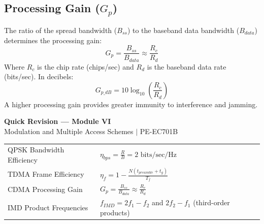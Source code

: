 \documentclass[12pt,a4paper]{article}
\renewcommand{\arraystretch}{1.45}
\begin{document}
\subsection{Processing Gain ($G_p$)}
The ratio of the spread bandwidth ($B_{ss}$) to the baseband data bandwidth ($B_{data}$) determines the processing gain:
\begin{equation}
  G_p = \frac{B_{ss}}{B_{data}} \approx \frac{R_c}{R_d}
\end{equation}
Where $R_c$ is the chip rate (chips/sec) and $R_d$ is the baseband data rate (bits/sec).
In decibels:
\begin{equation}
  G_{p\_dB} = 10 \log_{10}\left( \frac{R_c}{R_d} \right)
\end{equation}
A higher processing gain provides greater immunity to interference and jamming.

\newpage
\begin{center}
  {\large\bfseries\color{myred} Quick Revision --- Module VI}\\[3pt]
  {\small\color{mydark} Modulation and Multiple Access Schemes $|$ PE-EC701B}
\end{center}
\noindent{\color{myred}\rule{\linewidth}{1.2pt}}
\vspace{4pt}

\begin{tcolorbox}[formulabox, title={\textbf{Key Formulas at a Glance}}]
\renewcommand{\arraystretch}{1.9}
\begin{tabularx}{\linewidth}{B{5.0cm} X}QPSK Bandwidth Efficiency & $\displaystyle \eta_{bps} = \frac{R}{B} = 2 \text{ bits/sec/Hz}$ \\[4pt]
TDMA Frame Efficiency & $\displaystyle \eta_f = 1 - \frac{N(t_{preamble} + t_g)}{T_f}$ \\[4pt]
CDMA Processing Gain & $\displaystyle G_p = \frac{B_{ss}}{B_{data}} \approx \frac{R_c}{R_d}$ \\[4pt]
IMD Product Frequencies & $f_{IMD} = 2f_1 - f_2$ \quad and \quad $2f_2 - f_1$ \quad (third-order products)
\end{tabularx}
\end{tcolorbox}
\end{document}
